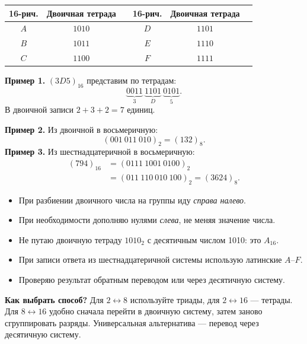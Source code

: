 \documentclass[a4paper,12pt]{article}
\newcommand{\key}[1]{\textbf{\color{darkaccent}#1}}
\newcommand{\checkitem}[1]{\item[\(\square\)] #1}
\newenvironment{skills}{\begin{itemize}[label=\(\square\),leftmargin=*,itemsep=2pt]}{\end{itemize}}
\newcommand{\sys}[2]{\left(#1\right)_{#2}}
\begin{document}
\begin{center}
\renewcommand{\arraystretch}{1.2}
\begin{tabular}{@{}cccccc@{}}
\toprule
16-рич. & Двоичная тетрада & & 16-рич. & Двоичная тетрада \\
\midrule
\(A\) & \(1010\) & & \(D\) & \(1101\) \\
\(B\) & \(1011\) & & \(E\) & \(1110\) \\
\(C\) & \(1100\) & & \(F\) & \(1111\) \\
\bottomrule
\end{tabular}
\end{center}
\textbf{Пример 1.} \(\sys{3D5}{16}\) представим по тетрадам:
\[
\underbrace{0011}_{3}\ \underbrace{1101}_{D}\ \underbrace{0101}_{5}.
\]
В двоичной записи \(2+3+2=7\) единиц.

\textbf{Пример 2.} Из двоичной в восьмеричную:
\[
\sys{001\ 011\ 010}{2}=\sys{132}{8}.
\]
\textbf{Пример 3.} Из шестнадцатеричной в восьмеричную:
\[
\begin{aligned}
\sys{794}{16}&=\sys{0111\ 1001\ 0100}{2}\\
&=\sys{011\ 110\ 010\ 100}{2}=\sys{3624}{8}.
\end{aligned}
\]

\begin{skills}
\checkitem{При разбиении двоичного числа на группы иду \emph{справа налево}.}
\checkitem{При необходимости дополняю нулями \emph{слева}, не меняя значение числа.}
\checkitem{Не путаю двоичную тетраду \(1010_2\) с десятичным числом 1010: это \(A_{16}\).}
\checkitem{При записи ответа из шестнадцатеричной системы использую латинские \(A\)--\(F\).}
\checkitem{Проверяю результат обратным переводом или через десятичную систему.}
\end{skills}

\key{Как выбрать способ?} Для \(2\leftrightarrow8\) используйте триады, для \(2\leftrightarrow16\) --- тетрады. Для \(8\leftrightarrow16\) удобно сначала перейти в двоичную систему, затем заново сгруппировать разряды. Универсальная альтернатива --- перевод через десятичную систему.

\clearpage
\end{document}
